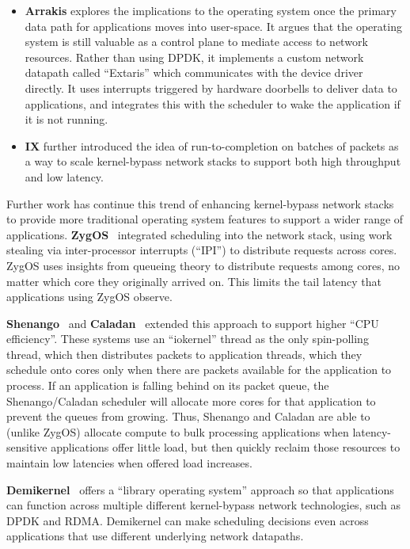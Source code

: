\begin{itemize}
\item \textbf{Arrakis} explores the implications to the operating system once the primary data path for applications moves into user-space. It argues that the operating system is still valuable as a control plane to mediate access to network resources. Rather than using DPDK, it implements a custom network datapath called ``Extaris'' which communicates with the device driver directly. 
It uses interrupts triggered by hardware doorbells to deliver data to applications, and integrates this with the scheduler to wake the application if it is not running.
\item \textbf{IX} further introduced the idea of run-to-completion on batches of packets as a way to scale kernel-bypass network stacks to support both high throughput and low latency.
\end{itemize}

Further work has continue this trend of enhancing kernel-bypass network stacks to provide more traditional operating system features to support a wider range of applications.
\textbf{ZygOS}~\cite{zygos} integrated scheduling into the network stack, using work stealing via inter-processor interrupts (``IPI'') to distribute requests across cores. ZygOS uses insights from queueing theory to distribute requests among cores, no matter which core they originally arrived on. This limits the tail latency that applications using ZygOS observe. 

\textbf{Shenango}~\cite{shenango} and \textbf{Caladan}~\cite{caladan} extended this approach to support higher ``CPU efficiency''. These systems use an ``iokernel'' thread as the only spin-polling thread, which then distributes packets to application threads, which they schedule onto cores only when there are packets available for the application to process. 
If an application is falling behind on its packet queue, the Shenango/Caladan scheduler will allocate more cores for that application to prevent the queues from growing.
Thus, Shenango and Caladan are able to (unlike ZygOS) allocate compute to bulk processing applications when latency-sensitive applications offer little load, but then quickly reclaim those resources to maintain low latencies when offered load increases.

\textbf{Demikernel}~\cite{demikernel} offers a ``library operating system'' approach so that applications can function across multiple different kernel-bypass network technologies, such as DPDK and RDMA. Demikernel can make scheduling decisions even across applications that use different underlying network datapaths.

